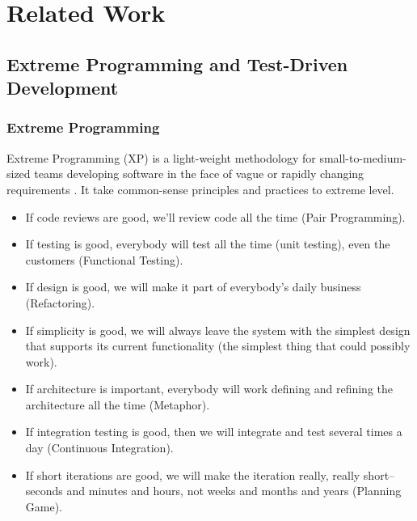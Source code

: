 \chapter{Related Work}
\label{chap:RelatedWork}

\section{Extreme Programming and Test-Driven Development}
\subsection{Extreme Programming}
Extreme Programming (XP) is a light-weight methodology for
small-to-medium-sized teams developing software in the face of vague or
rapidly changing requirements \cite{Beck:00}. It take common-sense
principles and practices to extreme level.
\begin{itemize}
\item If code reviews are good, we'll review code all the time (Pair Programming). 
\item If testing is good, everybody will test all the time (unit testing),
  even the customers (Functional Testing).
\item If design is good, we will make it part of everybody's daily business
  (Refactoring).
\item If simplicity is good, we will always leave the system with the
  simplest design that supports its current functionality (the simplest
  thing that could possibly work).
\item If architecture is important, everybody will work defining and
  refining the architecture all the time (Metaphor).
\item If integration testing is good, then we will integrate and test
  several times a day (Continuous Integration).
\item If short iterations are good, we will make the iteration really,
  really short--seconds and minutes and hours, not weeks and months and
  years (Planning Game).
\end{itemize}

